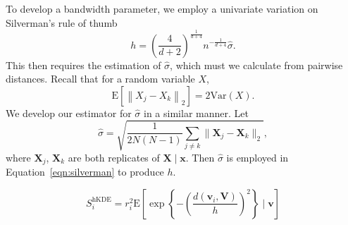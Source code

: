 To develop a bandwidth parameter, we employ a univariate variation on 
    Silverman's rule of thumb
    \begin{equation}
        \label{eqn:silverman}
        h = \left(\frac{4}{d+2}\right)^{
            \frac{1}{d+4}}n^{-\frac{1}{d+4}}\hat{\sigma}.
    \end{equation}
    This then requires the estimation of $\hat{\sigma}$, which must we calculate 
    from pairwise distances. Recall that for a random variable $X$, 
    \[ 
        \text{E}\left[\left\lVert X_j - X_k\right\rVert_2\right] 
            = 2\text{Var}(X). 
    \]
    We develop our estimator for $\hat{\sigma}$ in a similar manner.  Let
    \[
        \hat{\sigma} = \sqrt{\frac{1}{2N(N-1)}\sum_{j\neq k}\lVert 
            \bm{X}_j - \bm{X}_k\rVert_2},
    \]
    where $\bm{X}_j$, $\bm{X}_k$ are both replicates of $\bm{X}\mid\bm{x}$. Then 
    $\hat{\sigma}$ is employed in Equation~\ref{eqn:silverman} to produce $h$.
 
\begin{equation}
    \label{eqn:ad_kde_h}
    S_i^{\text{hKDE}} = r_i^{2}\text{E}\left[\exp\left\lbrace -
    \left(\frac{d(\bm{v}_i,\bm{V})}{h}\right)^2\right\rbrace\mid\bm{v}\right]
\end{equation}

